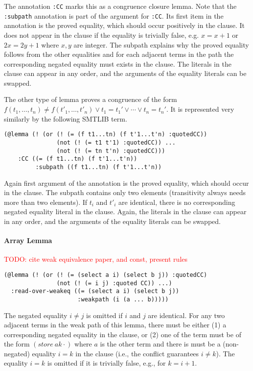 \documentclass[a4paper]{article}
\newcommand\todo[1]{\textcolor{red}{TODO: #1}}
\begin{document}
The annotation \verb+:CC+ marks this as a congruence closure lemma.
Note that the \verb+:subpath+ annotation is part of the argument for
\verb+:CC+.  Its first item in the annotation is the proved equality,
which should occur positively in the clause.  It does not appear in
the clause if the equality is trivially false, e.g. $x = x+1$ or $2x =
2y+1$ where $x,y$ are integer.  The subpath explains why the proved
equality follows from the other equalities and for each adjacent terms
in the path the corresponding negated equality must exists in the
clause.  The literals in the clause can appear in any order, and the
arguments of the equality literals can be swapped.

The other type of lemma proves a congruence of the form $f(t_1, \dots,
t_n)\neq f(t'_1,\dots,t'_n) \lor t_1=t_1' \lor \cdots \lor t_n=t_n'$.
It is represented very similarly by the following SMTLIB term.

\begin{verbatim}
(@lemma (! (or (! (= (f t1...tn) (f t'1...t'n) :quotedCC))
               (not (! (= t1 t'1) :quotedCC)) ...
               (not (! (= tn t'n) :quotedCC)))
    :CC ((= (f t1...tn) (f t'1...t'n)) 
         :subpath ((f t1...tn) (f t'1...t'n))
\end{verbatim}

Again first argument of the annotation is the proved equality, which
should occur in the clause.  The subpath contains only two
elements (transitivity always needs more than two elements).  If $t_i$
and $t'_i$ are identical, there is no corresponding negated equality
literal in the clause.  Again, the literals in the clause can appear
in any order, and the arguments of the equality literals can be
swapped.

\paragraph{Array Lemma}
\todo{cite weak equivalence paper, and const, present rules}

\begin{verbatim}
(@lemma (! (or (! (= (select a i) (select b j)) :quotedCC) 
               (not (! (= i j) :quoted CC)) ...)
  :read-over-weakeq ((= (select a i) (select b j))
                     :weakpath (i (a ... b)))))
\end{verbatim}
The negated equality $i\neq j$ is omitted if $i$ and $j$ are identical.
For any two adjacent terms in the weak path of this lemma, there must be either
(1) a corresponding negated equality in the clause, or (2) one of the term must be of
the form $(store\ a k \cdot)$ where $a$ is the other term and there is must be
a (non-negated) equality $i=k$ in the clause (i.e., the conflict guarantees $i\neq k$).
The equality $i=k$ is omitted if it is trivially false, e.g., for $k = i+1$.
\end{document}
